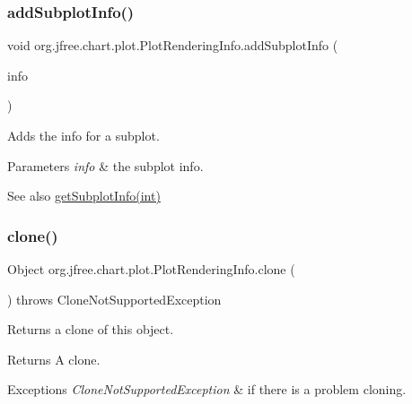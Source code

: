 \subsubsection{\texorpdfstring{add\+Subplot\+Info()}{addSubplotInfo()}}
{\footnotesize\ttfamily void org.\+jfree.\+chart.\+plot.\+Plot\+Rendering\+Info.\+add\+Subplot\+Info (\begin{DoxyParamCaption}\item[{\mbox{\hyperlink{classorg_1_1jfree_1_1chart_1_1plot_1_1_plot_rendering_info}{Plot\+Rendering\+Info}}}]{info }\end{DoxyParamCaption})}

Adds the info for a subplot.


\begin{DoxyParams}{Parameters}
{\em info} & the subplot info.\\
\hline
\end{DoxyParams}
\begin{DoxySeeAlso}{See also}
\mbox{\hyperlink{classorg_1_1jfree_1_1chart_1_1plot_1_1_plot_rendering_info_a5ed7e19543067de91316df65cd079f53}{get\+Subplot\+Info(int)}} 
\end{DoxySeeAlso}
\mbox{\label{classorg_1_1jfree_1_1chart_1_1plot_1_1_plot_rendering_info_a59e8a96b0d4e96422e505cd774932308}} 
\subsubsection{\texorpdfstring{clone()}{clone()}}
{\footnotesize\ttfamily Object org.\+jfree.\+chart.\+plot.\+Plot\+Rendering\+Info.\+clone (\begin{DoxyParamCaption}{ }\end{DoxyParamCaption}) throws Clone\+Not\+Supported\+Exception}

Returns a clone of this object.

\begin{DoxyReturn}{Returns}
A clone.
\end{DoxyReturn}

\begin{DoxyExceptions}{Exceptions}
{\em Clone\+Not\+Supported\+Exception} & if there is a problem cloning. \\
\hline
\end{DoxyExceptions}
\mbox{\label{classorg_1_1jfree_1_1chart_1_1plot_1_1_plot_rendering_info_a674370bbb73a8b89d31d199ae67b4e69}} 
